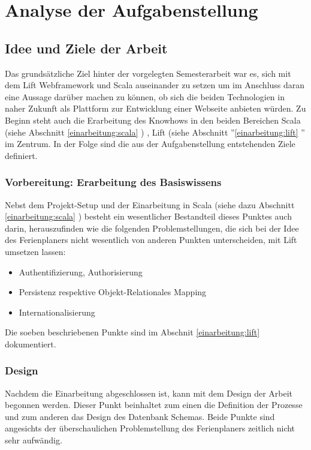 \chapter{Analyse der Aufgabenstellung}
\section{Idee und Ziele der Arbeit}
Das grunds\"atzliche Ziel hinter der vorgelegten Semesterarbeit war es, sich mit dem Lift Webframework und Scala auseinander zu setzen um im Anschluss daran eine Aussage dar\"uber machen zu k\"onnen, ob sich die beiden Technologien in naher Zukunft als Plattform zur Entwicklung einer Webseite anbieten w\"urden. Zu Beginn steht auch die Erarbeitung des Knowhows in den beiden Bereichen Scala (siehe Abschnitt \ref{einarbeitung:scala} ) , Lift (siehe Abschnitt ''\ref{einarbeitung:lift} '' im Zentrum. In der Folge sind die aus der Aufgabenstellung entstehenden Ziele definiert.

\subsection{Vorbereitung: Erarbeitung des Basiswissens}
Nebst dem Projekt-Setup und der Einarbeitung in Scala (siehe dazu Abschnitt \ref{einarbeitung:scala} )  besteht ein wesentlicher Bestandteil dieses Punktes auch darin, herauszufinden wie die folgenden Problemstellungen, die sich bei der Idee des Ferienplaners nicht wesentlich von anderen Punkten unterscheiden, mit Lift umsetzen lassen:
	\begin{itemize}
		\item Authentifizierung, Authorisierung
		\item Persistenz respektive Objekt-Relationales Mapping
		\item Internationalisierung
	\end{itemize}
Die soeben beschriebenen Punkte sind im Abschnit \ref{einarbeitung:lift}  dokumentiert.

\subsection{Design}
Nachdem die Einarbeitung abgeschlossen ist, kann mit dem Design der Arbeit begonnen werden. Dieser Punkt beinhaltet zum einen die Definition der Prozesse und zum anderen das Design des Datenbank Schemas. Beide Punkte sind angesichts der \"uberschaulichen Problemstellung des Ferienplaners zeitlich nicht sehr aufw\"andig.

